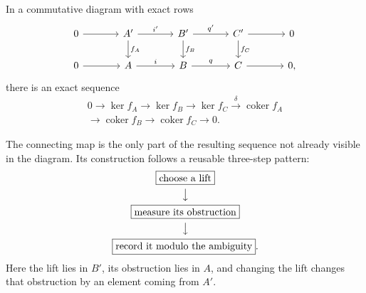 \begin{theorem}\label{thm:snake-lemma}
In a commutative diagram with exact rows
\[
\begin{tikzcd}[column sep=large]
0\arrow[r]&A'\arrow[r,"i'"]\arrow[d,"f_A"]&
B'\arrow[r,"q'"]\arrow[d,"f_B"]&
C'\arrow[r]\arrow[d,"f_C"]&0\\
0\arrow[r]&A\arrow[r,"i"]&
B\arrow[r,"q"]&
C\arrow[r]&0,
\end{tikzcd}
\]
there is an exact sequence
\[
\begin{gathered}
0\longrightarrow\ker f_A\longrightarrow\ker f_B
\longrightarrow\ker f_C\xrightarrow{\delta}\operatorname{coker}f_A\\
\longrightarrow\operatorname{coker}f_B\longrightarrow
\operatorname{coker}f_C\longrightarrow0.
\end{gathered}
\]
\end{theorem}
The connecting map is the only part of the resulting sequence not already
visible in the diagram.  Its construction follows a reusable three-step
pattern:
\[
\begin{gathered}
\boxed{\text{choose a lift}}\\
\big\downarrow\\
\boxed{\text{measure its obstruction}}\\
\big\downarrow\\
\boxed{\text{record it modulo the ambiguity}}.
\end{gathered}
\]
Here the lift lies in \(B'\), its obstruction lies in \(A\), and changing
the lift changes that obstruction by an element coming from \(A'\).

